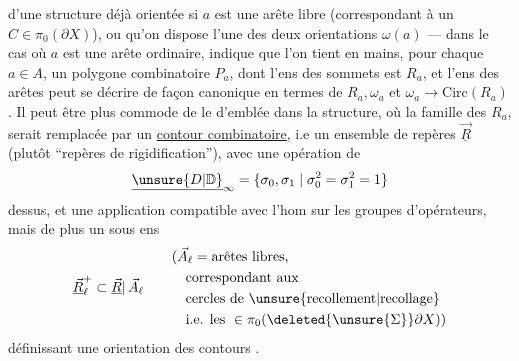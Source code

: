 d'une structure déjà orientée si $a$ est une arête libre (correspondant à un $C\in\pi_{0}(\partial X)$), ou qu'on dispose  l'une des deux orientations $\omega(a)$ --- dans le cas où $a$ est une arête ordinaire, indique que l'on tient en mains, pour chaque $a\in A$, un polygone combinatoire $P_a$, dont l'ens des sommets est $R_a$, et l'ens des arêtes peut se décrire  de façon canonique en termes de $R_a,\omega_a$ et $\omega_a\longrightarrow\mathrm{Circ}(R_a)$. Il peut être plus commode de le  d'emblée dans la structure, où la famille des $R_a$, serait remplacée par un  \uline{contour combinatoire}, i.e un ensemble de repères $\underline{\vec R}$ (plutôt ``repères de rigidification''), avec une opération de
\[
\underline{\unsure{D|\mathbb D}}_{\infty}
=\{\sigma_{0},\sigma_{1}\mid\sigma_{0}^{2}=\sigma_{1}^{2}=1\}
\]
dessus, et une application
compatible avec l'hom
sur les groupes d'opérateurs, mais de plus un sous ens
\[
\underline{\vec R}_{\ell}^{+}\subset\underline{\vec R}|\,\vec A_{\ell}
\qquad
\begin{aligned}
&(\vec A_{\ell}=\text{arêtes libres,}\\
&\quad\text{correspondant aux}\\
&\quad\text{cercles de \unsure{recollement|recollage}}\\
&\quad\text{i.e. les }\in\pi_0(\deleted{\unsure{\Sigma}}\partial X))
\end{aligned}
\]
définissant une orientation des contours .
